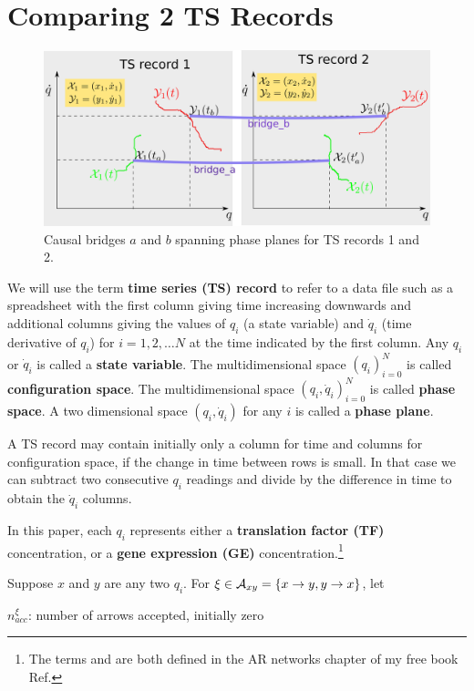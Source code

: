 \documentclass[12pt]{article}
\begin{document}
\section{Comparing 2 TS Records}
\begin{figure}[h!]
\centering
\includegraphics[width=5in]
{two-phase-plane-bridges.png}
\caption{Causal bridges $a$ and $b$ spanning
	phase planes for
TS records 1 and 2.}
\label{fig-two-phase-plane-bridges}
\end{figure}

We will use the term {\bf time series (TS) record}
to refer to
a data file such as a spreadsheet with the first column 
giving time increasing downwards and additional columns giving the values
of $q_i$ (a state variable) and $\dot{q}_i$ (time derivative of $q_i$) for $i=1, 2, \ldots N$
at the time indicated by the first column.
Any $q_i$ or $\dot{q}_i$ is called a {\bf state variable}.
The multidimensional space $(q_i)_{i=0}^{N}$
is called {\bf configuration space}.
The multidimensional space $(q_i, \dot{q}_i)_{i=0}^{N}$
is called {\bf phase space}.
A two dimensional space $(q_i, \dot{q}_i)$ for any 
$i$ is called a {\bf phase plane}.

A TS record may contain initially only a column 
for time and columns for configuration space,
if the change in time between rows is small. 
In that case we can subtract two consecutive
$q_i$ readings and divide by the difference
in time to obtain the $\dot{q}_i$ columns.

In this paper, each $q_i$ represents either a {\bf translation
factor (TF)} concentration, or a {\bf gene expression (GE)} concentration.\footnote{The 
terms 
and  are both defined
in the AR networks chapter of my free book Ref.\cite{Bayesuvius}}


Suppose $x$ and $y$
are any two $q_i$. For $\xi \in
{\cal A}_{xy}=
\{x\rightarrow y, y\rightarrow x\}$, let

$n_{acc}^{\xi}$: number of arrows 
accepted, initially zero
\end{document}
